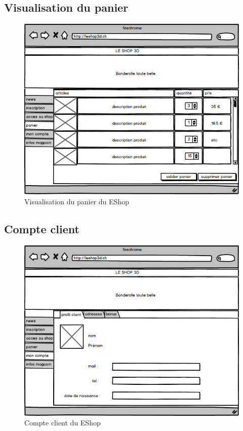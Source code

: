 \documentclass[12pt]{article}
\begin{document}
\newpage
\subsection{Visualisation du panier}

\begin{figure}[ht]
    \center
    \includegraphics[scale=0.6]{../Maquettes/visualisation_panier.jpeg}
    \caption*{Visualisation du panier du EShop}
\end{figure}

\newpage
\subsection{Compte client}

\begin{figure}[ht]
    \center
    \includegraphics[scale=0.6]{../Maquettes/compte_client.jpeg}
    \caption*{Compte client du EShop}
\end{figure}
\end{document}
